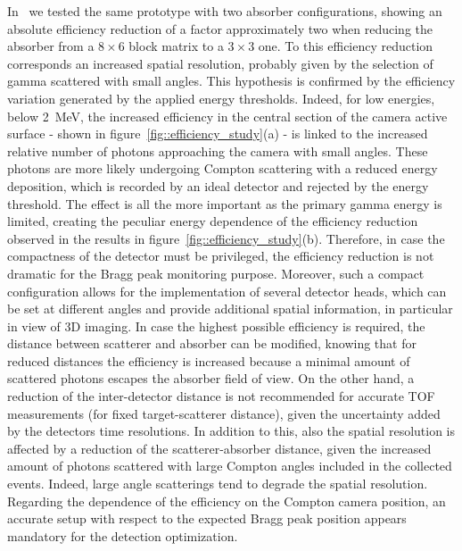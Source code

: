 In~\cite{Fontana_APPB} we tested the same prototype with two absorber configurations, showing an absolute efficiency reduction of a factor approximately two when reducing the absorber from a $8\times6$ block matrix to a $3\times3$ one. To this efficiency reduction corresponds an increased spatial resolution, probably given by the selection of gamma scattered with small angles. This hypothesis is confirmed by the efficiency variation generated by the applied energy thresholds. Indeed, for low energies, below 2~MeV, the increased efficiency in the central section of the camera active surface - shown in figure~\ref{fig::efficiency_study}(a) - is linked to the increased relative number of photons approaching the camera with small angles. These photons are more likely undergoing Compton scattering with a reduced energy deposition, which is recorded by an ideal detector and rejected by the energy threshold. The effect is all the more important as the primary gamma energy is limited, creating the peculiar energy dependence of the efficiency reduction observed in the results in figure~\ref{fig::efficiency_study}(b). Therefore, in case the compactness of the detector must be privileged, the efficiency reduction is not dramatic for the Bragg peak monitoring purpose. Moreover, such a compact configuration allows for the implementation of several detector heads, which can be set at different angles and provide additional spatial information, in particular in view of 3D imaging. In case the highest possible efficiency is required, the distance between scatterer and absorber can be modified, knowing that for reduced distances the efficiency is increased because a minimal amount of scattered photons escapes the absorber field of view. On the other hand, a reduction of the inter-detector distance is not recommended for accurate TOF measurements (for fixed target-scatterer distance), given the uncertainty added by the detectors time resolutions. In addition to this, also the spatial resolution is affected by a reduction of the scatterer-absorber distance, given the increased amount of photons scattered with large Compton angles included in the collected events. Indeed, large angle scatterings tend to degrade the spatial resolution.   
Regarding the dependence of the efficiency on the Compton camera position, an accurate setup with respect to the expected Bragg peak position appears mandatory for the detection optimization.

